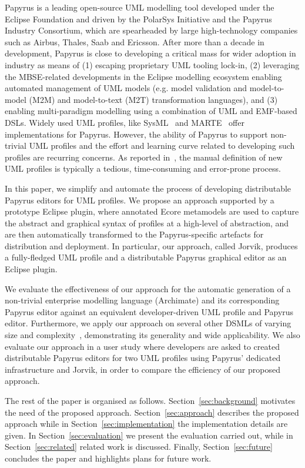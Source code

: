 Papyrus \cite{lanusse2009papyrus} is a leading open-source UML modelling tool developed under the Eclipse Foundation and driven by the PolarSys Initiative and the Papyrus Industry Consortium, which are spearheaded by large high-technology companies such as Airbus, Thales, Saab and Ericsson.  
After more than a decade in development, Papyrus is close to developing a critical mass for wider adoption in industry as means of (1) escaping proprietary UML tooling lock-in, (2) leveraging the MBSE-related developments in the Eclipse modelling ecosystem enabling automated management of UML models (e.g. model validation and model-to-model (M2M) and model-to-text (M2T) transformation languages), and (3) enabling multi-paradigm modelling using a combination of UML and EMF-based DSLs. 
Widely used UML profiles, like SysML~\cite{friedenthal2014practical} and MARTE~\cite{omg2011marte} offer implementations for Papyrus. 
However, the ability of Papyrus to support non-trivial UML profiles and the effort and learning curve related to developing such profiles are recurring concerns. 
As reported in~\cite{Wimmer2009:IJWIS}, the manual definition of new UML profiles is typically a tedious, time-consuming and error-prone process.

In this paper, we simplify and automate the process of developing distributable Papyrus editors for UML profiles. 
We propose an approach supported by a prototype Eclipse plugin, where annotated Ecore metamodels are used to capture the abstract and graphical syntax of profiles at a high-level of abstraction, and are then automatically transformed to the Papyrus-specific artefacts for distribution and deployment. 
In particular, our approach, called Jorvik, produces a fully-fledged UML profile and a distributable Papyrus graphical editor as an Eclipse plugin. 

We evaluate the effectiveness of our approach for the automatic generation of a non-trivial enterprise modelling language (Archimate) and its corresponding Papyrus editor against an equivalent developer-driven UML profile and Papyrus editor. 
Furthermore, we apply our approach on several other DSMLs of varying size and complexity~\cite{williams2013metamodels}, demonstrating its generality and wide applicability. We also evaluate our approach in a user study where developers are asked to created distributable Papyrus editors for two UML profiles using Papyrus' dedicated infrastructure and Jorvik, in order to compare the efficiency of our proposed approach.

The rest of the paper is organised as follows. 
Section~\ref{sec:background} motivates the need of the proposed approach. 
Section~\ref{sec:approach} describes the proposed approach while in Section~\ref{sec:implementation} the implementation details are given. 
In Section~\ref{sec:evaluation} we present the evaluation carried out, while in Section~\ref{sec:related} related work is discussed. 
Finally, Section~\ref{sec:future} concludes the paper and highlights plans for future work.